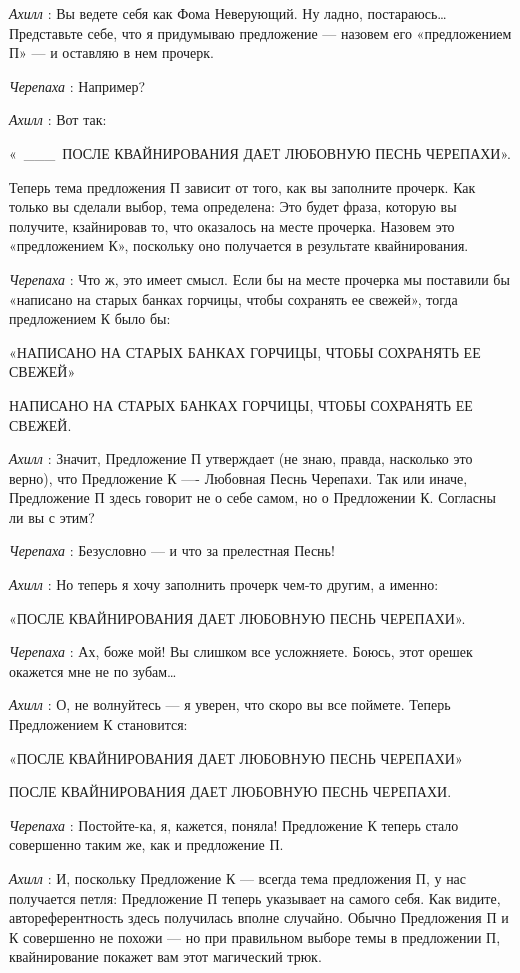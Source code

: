 \documentclass[../main.tex]{subfiles}
\begin{document}
\begin{dialogue}
\emph{Ахилл} : Вы ведете себя как Фома Неверующий. Ну ладно, постараюсь\ldots{} Представьте себе, что я придумываю предложение --- назовем его «предложением П» --- и оставляю в нем прочерк.

\emph{Черепаха} : Например?

\emph{Ахилл} : Вот так:

«~\_\_\_~ПОСЛЕ КВАЙНИРОВАНИЯ ДАЕТ ЛЮБОВНУЮ ПЕСНЬ ЧЕРЕПАХИ».

Теперь тема предложения П зависит от того, как вы заполните прочерк. Как только вы сделали выбор, тема определена: Это будет фраза, которую вы получите, кзайнировав то, что оказалось на месте прочерка. Назовем это «предложением К», поскольку оно получается в результате квайнирования.

\emph{Черепаха} : Что ж, это имеет смысл. Если бы на месте прочерка мы поставили бы «написано на старых банках горчицы, чтобы сохранять ее свежей», тогда предложением К было бы:

«НАПИСАНО НА СТАРЫХ БАНКАХ ГОРЧИЦЫ, ЧТОБЫ СОХРАНЯТЬ ЕЕ СВЕЖЕЙ»

НАПИСАНО НА СТАРЫХ БАНКАХ ГОРЧИЦЫ, ЧТОБЫ СОХРАНЯТЬ ЕЕ СВЕЖЕЙ.

\emph{Ахилл} : Значит, Предложение П утверждает (не знаю, правда, насколько это верно), что Предложение К ---- Любовная Песнь Черепахи. Так или иначе, Предложение П здесь говорит не о себе самом, но о Предложении К. Согласны ли вы с этим?

\emph{Черепаха} : Безусловно --- и что за прелестная Песнь!

\emph{Ахилл} : Но теперь я хочу заполнить прочерк чем-то другим, а именно:

«ПОСЛЕ КВАЙНИРОВАНИЯ ДАЕТ ЛЮБОВНУЮ ПЕСНЬ ЧЕРЕПАХИ».

\emph{Черепаха} : Ах, боже мой! Вы слишком все усложняете. Боюсь, этот орешек окажется мне не по зубам\ldots{}

\emph{Ахилл} : О, не волнуйтесь --- я уверен, что скоро вы все поймете. Теперь Предложением К становится:

«ПОСЛЕ КВАЙНИРОВАНИЯ ДАЕТ ЛЮБОВНУЮ ПЕСНЬ ЧЕРЕПАХИ»

ПОСЛЕ КВАЙНИРОВАНИЯ ДАЕТ ЛЮБОВНУЮ ПЕСНЬ ЧЕРЕПАХИ.

\emph{Черепаха} : Постойте-ка, я, кажется, поняла! Предложение К теперь стало совершенно таким же, как и предложение П.

\emph{Ахилл} : И, поскольку Предложение К --- всегда тема предложения П, у нас получается петля: Предложение П теперь указывает на самого себя. Как видите, автореферентность здесь получилась вполне случайно. Обычно Предложения П и К совершенно не похожи --- но при правильном выборе темы в предложении П, квайнирование покажет вам этот магический трюк.


\end{dialogue}
\end{document}
